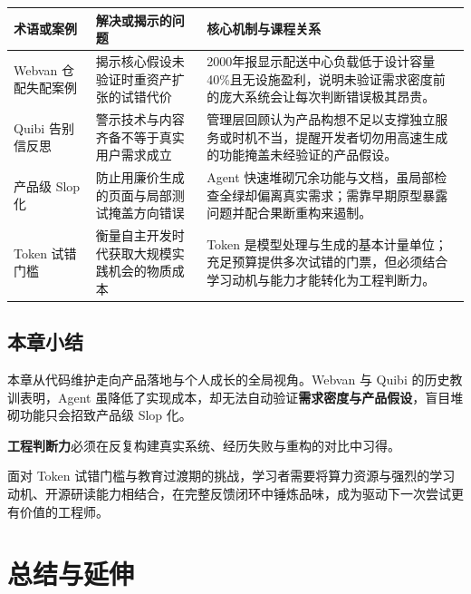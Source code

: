 \documentclass[UTF8,a4paper,11pt,fontset=fandol]{ctexart}
\begin{document}
\begin{center}\small\begin{tabularx}{\linewidth}{YYY}

\toprule

术语或案例 & 解决或揭示的问题 & 核心机制与课程关系\\\midrule

Webvan 仓配失配案例 & 揭示核心假设未验证时重资产扩张的试错代价 & 2000年报显示配送中心负载低于设计容量40\%且无设施盈利，说明未验证需求密度前的庞大系统会让每次判断错误极其昂贵。\\[3pt]

Quibi 告别信反思 & 警示技术与内容齐备不等于真实用户需求成立 & 管理层回顾认为产品构想不足以支撑独立服务或时机不当，提醒开发者切勿用高速生成的功能掩盖未经验证的产品假设。\\[3pt]

产品级 Slop 化 & 防止用廉价生成的页面与局部测试掩盖方向错误 & Agent 快速堆砌冗余功能与文档，虽局部检查全绿却偏离真实需求；需靠早期原型暴露问题并配合果断重构来遏制。\\[3pt]

Token 试错门槛 & 衡量自主开发时代获取大规模实践机会的物质成本 & Token 是模型处理与生成的基本计量单位；充足预算提供多次试错的门票，但必须结合学习动机与能力才能转化为工程判断力。\\[3pt]

\bottomrule\end{tabularx}\end{center}

\subsection{本章小结}

本章从代码维护走向产品落地与个人成长的全局视角。Webvan 与 Quibi 的历史教训表明，Agent 虽降低了实现成本，却无法自动验证\textbf{需求密度与产品假设}，盲目堆砌功能只会招致产品级 Slop 化。

\textbf{工程判断力}必须在反复构建真实系统、经历失败与重构的对比中习得。

面对 Token 试错门槛与教育过渡期的挑战，学习者需要将算力资源与强烈的学习动机、开源研读能力相结合，在完整反馈闭环中锤炼品味，成为驱动下一次尝试更有价值的工程师。

\section{总结与延伸}
\end{document}
